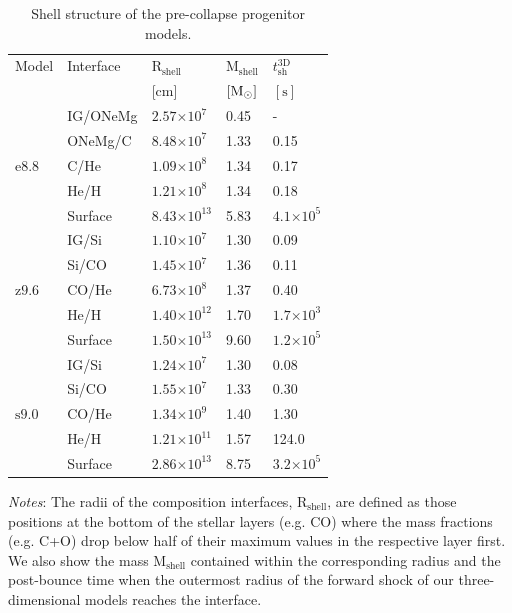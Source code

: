 \documentclass[fleqn,usenatbib]{mnras}
\newcommand{\solm}{\ensuremath{\rm{M_{\odot}}}\xspace}
\newcommand{\s}{\ensuremath{\text{s}}}
\newcommand{\onemg}{\ensuremath{\mathrm{e8.8}}\xspace}
\newcommand{\snine}{\ensuremath{\mathrm{s9.0}}\xspace}
\newcommand{\znine}{\ensuremath{\mathrm{z9.6}}\xspace}
\begin{document}
\begin{table}
   \caption{Shell structure of the pre-collapse progenitor models.}
   \label{tab:progenitors}
   \begin{tabular}{l l l l l} 
   \hline
     Model      &Interface & $\mathrm{R_{shell}\,}$ & $\mathrm{M_{shell}}$ & $t_{\mathrm{sh}}^{\mathrm{3D}}$\\ [0.5ex] 
                &          & [cm] & $[\solm]$ & $[\s]$\\ [0.5ex] 
   \hline
   \multirow{5}{*}{\onemg} & IG/ONeMg & $2.57\mathord{\times} 10^{7}$  & 0.45 & - \\ 
                           & ONeMg/C  & $8.48\mathord{\times} 10^{7}$  & 1.33 & 0.15 \\
                           & C/He     & $1.09\mathord{\times} 10^{8}$  & 1.34 & 0.17 \\
                           & He/H     & $1.21\mathord{\times} 10^{8}$  & 1.34 & 0.18\\
                           & Surface  & $8.43\mathord{\times} 10^{13}$ & 5.83 & $4.1\mathord{\times}10^5$\\
   \hline
   \multirow{5}{*}{\znine} & IG/Si    & $1.10\mathord{\times} 10^{7}$  & 1.30 & 0.09 \\ 
                           & Si/CO    & $1.45\mathord{\times} 10^{7}$  & 1.36 & 0.11\\ 
                           & CO/He    & $6.73\mathord{\times} 10^{8}$  & 1.37 & 0.40\\
                           & He/H     & $1.40\mathord{\times} 10^{12}$ & 1.70 & $1.7\mathord{\times}10^{3}$\\
                           & Surface  & $1.50\mathord{\times} 10^{13}$ & 9.60 & $1.2\mathord{\times}10^5$  \\
   \hline
   \multirow{5}{*}{\snine} & IG/Si    & $1.24\mathord{\times} 10^{7}$  & 1.30 & 0.08 \\ 
                           & Si/CO    & $1.55\mathord{\times} 10^{7}$  & 1.33 & 0.30 \\ 
                           & CO/He    & $1.34\mathord{\times} 10^{9}$  & 1.40 & 1.30\\
                           & He/H     & $1.21\mathord{\times} 10^{11}$ & 1.57 & 124.0 \\
                           & Surface  & $2.86\mathord{\times} 10^{13}$ & 8.75 & $3.2\mathord{\times} 10^5$ \\
  \hline
   \end{tabular}

\flushleft
\textit{Notes}: The radii of the composition interfaces, $\mathrm{R}_{\mathrm{shell}}$,
are defined as those positions at the bottom of the stellar layers (e.g. CO)
where the mass fractions (e.g. C+O) drop below half of their maximum values 
in the respective layer first. We also show the mass $\mathrm{M}_{\mathrm{shell}}$ 
contained within the corresponding radius and the post-bounce time 
when the outermost radius of the
forward shock of our three-dimensional models reaches the interface.
\end{table}
\end{document}
